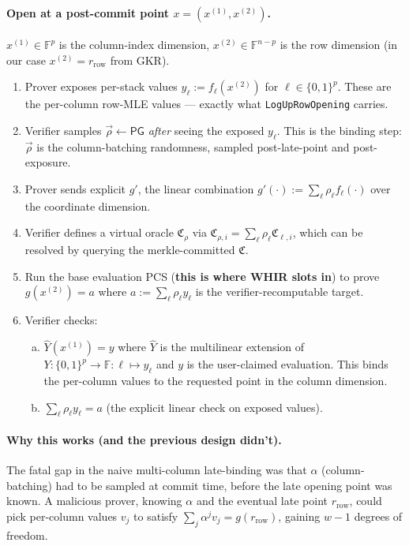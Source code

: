 \paragraph{Open at a post-commit point $x = (x^{(1)}, x^{(2)})$.}
$x^{(1)} \in \mathbb{F}^p$ is the column-index dimension,
$x^{(2)} \in \mathbb{F}^{n-p}$ is the row dimension (in our case
$x^{(2)} = r_{\mathrm{row}}$ from GKR).
\begin{enumerate}
  \item Prover exposes per-stack values
        $y_\ell := f_\ell(x^{(2)})$ for $\ell \in \{0,1\}^p$.  These
        are the per-column row-MLE values --- exactly what
        \texttt{LogUpRowOpening} carries.
  \item Verifier samples $\vec{\rho} \leftarrow \mathsf{PG}$
        \emph{after} seeing the exposed $y_\ell$.  This is the binding
        step: $\vec{\rho}$ is the column-batching randomness, sampled
        post-late-point and post-exposure.
  \item Prover sends explicit $g'$, the linear combination
        $g'(\cdot) := \sum_\ell \rho_\ell f_\ell(\cdot)$ over the
        coordinate dimension.
  \item Verifier defines a virtual oracle
        $\mathfrak{C}_\rho$ via $\mathfrak{C}_{\rho,i}
        = \sum_\ell \rho_\ell \mathfrak{C}_{\ell,i}$, which can be
        resolved by querying the merkle-committed $\mathfrak{C}$.
  \item Run the base evaluation PCS (\textbf{this is where WHIR
        slots in}) to prove $g(x^{(2)}) = a$ where $a := \sum_\ell
        \rho_\ell y_\ell$ is the verifier-recomputable target.
  \item Verifier checks:
        \begin{enumerate}[(a)]
          \item $\hat{Y}(x^{(1)}) = y$ where $\hat{Y}$ is the
                multilinear extension of
                $Y: \{0,1\}^p \to \mathbb{F}: \ell \mapsto y_\ell$
                and $y$ is the user-claimed evaluation.  This binds
                the per-column values to the requested point in the
                column dimension.
          \item $\sum_\ell \rho_\ell y_\ell = a$ (the explicit linear
                check on exposed values).
        \end{enumerate}
\end{enumerate}

\paragraph{Why this works (and the previous design didn't).}
The fatal gap in the naive multi-column late-binding was that
$\alpha$ (column-batching) had to be sampled at commit time, before
the late opening point was known.  A malicious prover, knowing
$\alpha$ and the eventual late point $r_{\mathrm{row}}$, could pick
per-column values $v_j$ to satisfy $\sum_j \alpha^j v_j =
g(r_{\mathrm{row}})$, gaining $w-1$ degrees of freedom.

